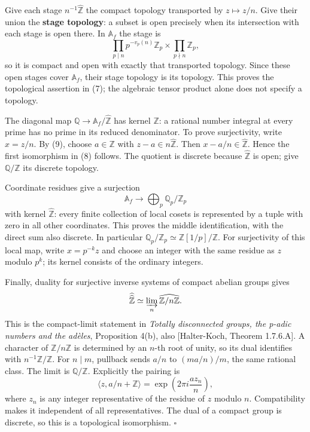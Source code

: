 \documentclass[
  english,
  11pt,
  a4paper,
]{article}
\begin{document}
Give each stage \(n^{-1}\widehat{\mathbb Z}\) the compact topology
transported by \(z\mapsto z/n\). Give their union the \textbf{stage
topology}: a subset is open precisely when its intersection with each
stage is open there. In \(\mathbb A_f\) the stage is
\[\prod_{p\mid n}p^{-v_p(n)}\mathbb Z_p
\times\prod_{p\nmid n}\mathbb Z_p,\] so it is compact and open with
exactly that transported topology. Since these open stages cover
\(\mathbb A_f\), their stage topology is its topology. This proves the
topological assertion in (7); the algebraic tensor product alone does
not specify a topology.

The diagonal map \(\mathbb Q\to\mathbb A_f/\widehat{\mathbb Z}\) has
kernel \(\mathbb Z\): a rational number integral at every prime has no
prime in its reduced denominator. To prove surjectivity, write
\(x=z/n\). By (9), choose \(a\in\mathbb Z\) with
\(z-a\in n\widehat{\mathbb Z}\). Then \(x-a/n\in\widehat{\mathbb Z}\).
Hence the first isomorphism in (8) follows. The quotient is discrete
because \(\widehat{\mathbb Z}\) is open; give \(\mathbb Q/\mathbb Z\)
its discrete topology.

Coordinate residues give a surjection
\[\mathbb A_f\longrightarrow\bigoplus_p\mathbb Q_p/\mathbb Z_p\] with
kernel \(\widehat{\mathbb Z}\): every finite collection of local cosets
is represented by a tuple with zero in all other coordinates. This
proves the middle identification, with the direct sum also discrete. In
particular \(\mathbb Q_p/\mathbb Z_p\simeq\mathbb Z[1/p]/\mathbb Z\).
For surjectivity of this local map, write \(x=p^{-k}z\) and choose an
integer with the same residue as \(z\) modulo \(p^k\); its kernel
consists of the ordinary integers.

Finally, duality for surjective inverse systems of compact abelian
groups gives \[\widehat{\widehat{\mathbb Z}}
\simeq\varinjlim_n\widehat{\mathbb Z/n\mathbb Z}.\] This is the
compact-limit statement in \emph{Totally disconnected groups, the p-adic
numbers and the adèles}, Proposition 4(b), also {[}Halter-Koch, Theorem
1.7.6.A{]}. A character of \(\mathbb Z/n\mathbb Z\) is determined by an
\(n\)-th root of unity, so its dual identifies with
\(n^{-1}\mathbb Z/\mathbb Z\). For \(n\mid m\), pullback sends \(a/n\)
to \((ma/n)/m\), the same rational class. The limit is
\(\mathbb Q/\mathbb Z\). Explicitly the pairing is
\[\langle z,a/n+\mathbb Z\rangle
=\exp\!\left(2\pi i\frac{a z_n}{n}\right),
\tag{10}\] where \(z_n\) is any integer representative of the residue of
\(z\) modulo \(n\). Compatibility makes it independent of all
representatives. The dual of a compact group is discrete, so this is a
topological isomorphism. \(\square\)
\end{document}
